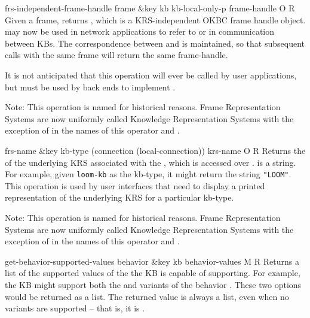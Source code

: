 \begin{okbcop}{frs-independent-frame-handle}{ frame \&key kb kb-local-only-p} { frame-handle } { O } { R } {  }
Given a frame, returns , which is a KRS-independent
   OKBC frame handle object.   may now be used in network
   applications to refer to  or in communication between KBs.
   The correspondence between  and  is
   maintained, so that subsequent calls with the same frame will return the
   same frame-handle.

   It is not anticipated that this operation will ever be called by user
   applications, but must be used by back ends to implement
   .

   Note:  This operation is named  for
   historical reasons.  Frame Representation Systems are now uniformly
   called Knowledge Representation Systems with the exception of in the names
   of this operator and .
\end{okbcop}

\begin{okbcop}{frs-name}{ \&key kb-type (connection (local-connection))} { krs-name } { O } { R } {  }
Returns the  of the underlying KRS associated with the
   , which is accessed over .
    is a string.  For example,
   given {\tt loom-kb} as the kb-type, it might return the string
   {\tt "LOOM"}.  This operation is used by user interfaces that need to
   display a printed representation of the underlying KRS for a particular
   kb-type.

   Note:  This operation is named  for
   historical reasons.  Frame Representation Systems are now uniformly
   called Knowledge Representation Systems with the exception of in the names
   of this operator and .
\end{okbcop}

\begin{okbcop}{get-behavior-supported-values}{ behavior \&key kb} { behavior-values } { M } { R } {  }
Returns a list of the supported values of the  
   the KB is capable of supporting.  For example, the KB might support both
   the  and  variants of the behavior
   .  These two options would be returned
   as a list.  The returned value  is always a list,
   even when no variants are supported -- that is, it is \emptylist.
\end{okbcop}

